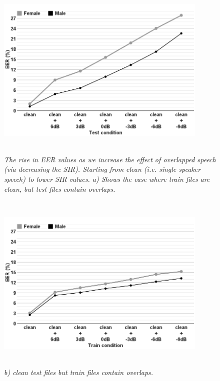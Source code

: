 \begin{figure}[h!]
	\centering
	\includegraphics[height = 3.43in, width=0.9\textwidth]{figures/sidingrid_ovlintest}
	\vspace{-1mm}
	\caption{\it The rise in EER values as we increase the effect of overlapped speech (via decreasing the SIR). Starting from clean (i.e. single-speaker speech) to lower SIR values. a) Shows the case where train files are clean, but test files contain overlaps. }
	\label{fig:sidingrid_ovlintest_train_a}
\end{figure}
\begin{figure}[h!]%
	\centering
	\includegraphics[height = 3.43in, width=0.9\textwidth]{figures/sidingrid_ovlintrain}
	\vspace{-1mm}
	\caption{\it b) clean test files but train files contain overlaps.}
	\label{fig:sidingrid_ovlintest_train_b}
\end{figure}



